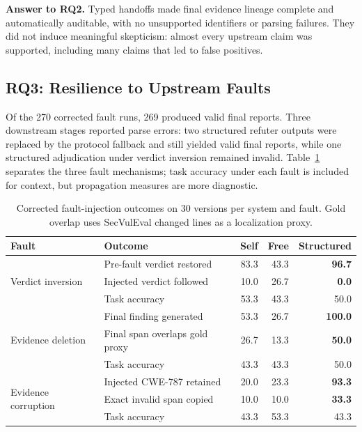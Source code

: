 \noindent\textbf{Answer to RQ2.} Typed handoffs made final evidence lineage complete and automatically auditable, with no unsupported identifiers or parsing failures. They did not induce meaningful skepticism: almost every upstream claim was supported, including many claims that led to false positives.

\subsection{RQ3: Resilience to Upstream Faults}

Of the 270 corrected fault runs, 269 produced valid final reports. Three downstream stages reported parse errors: two structured refuter outputs were replaced by the protocol fallback and still yielded valid final reports, while one structured adjudication under verdict inversion remained invalid. Table~\ref{tab:rq3} separates the three fault mechanisms; task accuracy under each fault is included for context, but propagation measures are more diagnostic.

\begin{table}[t]
\centering
\caption{Corrected fault-injection outcomes on 30 versions per system and fault. Gold overlap uses SecVulEval changed lines as a localization proxy.}
\label{tab:rq3}
\setlength{\tabcolsep}{4.2pt}
\begin{tabular}{llrrr}
\toprule
Fault & Outcome & Self & Free & Structured \\
\midrule
\multirow{3}{*}{Verdict inversion}
 & Pre-fault verdict restored & 83.3 & 43.3 & \textbf{96.7} \\
 & Injected verdict followed & 10.0 & 26.7 & \textbf{0.0} \\
 & Task accuracy & 53.3 & 43.3 & 50.0 \\
\midrule
\multirow{3}{*}{Evidence deletion}
 & Final finding generated & 53.3 & 26.7 & \textbf{100.0} \\
 & Final span overlaps gold proxy & 26.7 & 13.3 & \textbf{50.0} \\
 & Task accuracy & 43.3 & 43.3 & 50.0 \\
\midrule
\multirow{3}{*}{Evidence corruption}
 & Injected CWE-787 retained & 20.0 & 23.3 & \textbf{93.3} \\
 & Exact invalid span copied & 10.0 & 10.0 & \textbf{33.3} \\
 & Task accuracy & 43.3 & 53.3 & 43.3 \\
\bottomrule
\end{tabular}
\end{table}


